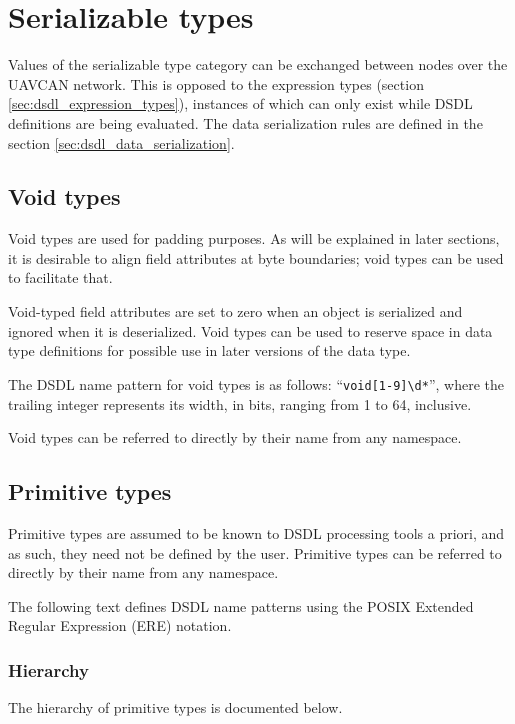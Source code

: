 \section{Serializable types}\label{sec:dsdl_serializable_types}

Values of the serializable type category can be exchanged between nodes over the UAVCAN network.
This is opposed to the expression types (section \ref{sec:dsdl_expression_types}),
instances of which can only exist while DSDL definitions are being evaluated.
The data serialization rules are defined in the section \ref{sec:dsdl_data_serialization}.

\subsection{Void types}

Void types are used for padding purposes.
As will be explained in later sections, it is desirable to align field attributes at byte boundaries;
void types can be used to facilitate that.

Void-typed field attributes are set to zero when an object is serialized and ignored when it is deserialized.
Void types can be used to reserve space in data type definitions for possible use in later versions of the data type.

The DSDL name pattern for void types is as follows: ``\verb|void[1-9]\d*|'',
where the trailing integer represents its width, in bits,
ranging from 1 to 64, inclusive.

Void types can be referred to directly by their name from any namespace.

\subsection{Primitive types}\label{sec:dsdl_primitive_types}

Primitive types are assumed to be known to DSDL processing tools a priori,
and as such, they need not be defined by the user.
Primitive types can be referred to directly by their name from any namespace.

The following text defines DSDL name patterns using the POSIX Extended Regular Expression (ERE) notation.

\subsubsection{Hierarchy}

The hierarchy of primitive types is documented below.

